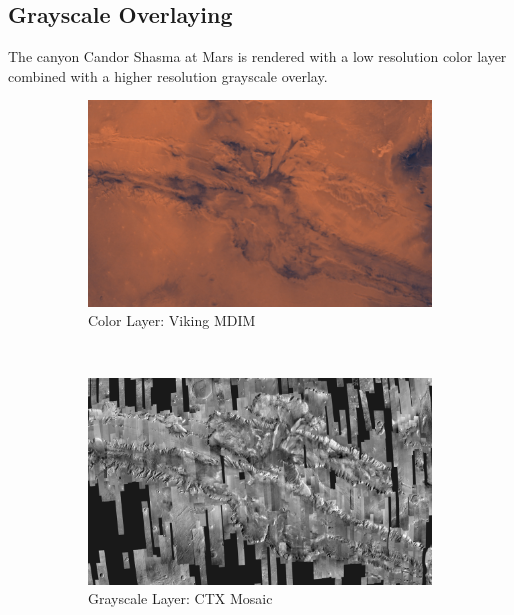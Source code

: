 \clearpage
\subsection{Grayscale Overlaying}
\FloatBarrier
The canyon Candor Shasma at Mars is rendered with a low resolution color layer combined with a higher resolution grayscale overlay.

\begin{figure}[h]
    \centering
    \begin{subfigure}[bt]{0.45\textwidth}
        \includegraphics[width=\textwidth]{figures/results/screenshots_thesis_old/valles_marineris1.jpg}
        \caption{Color Layer: Viking MDIM}
    \end{subfigure}
    ~
    \begin{subfigure}[bt]{0.45\textwidth}
        \includegraphics[width=\textwidth]{figures/results/screenshots_thesis_old/valles_marineris2.jpg}
        \caption{Grayscale Layer: CTX Mosaic}
    \end{subfigure}
    ~
    \begin{subfigure}[bt]{0.90\textwidth}

\end{subfigure}
\end{figure}
